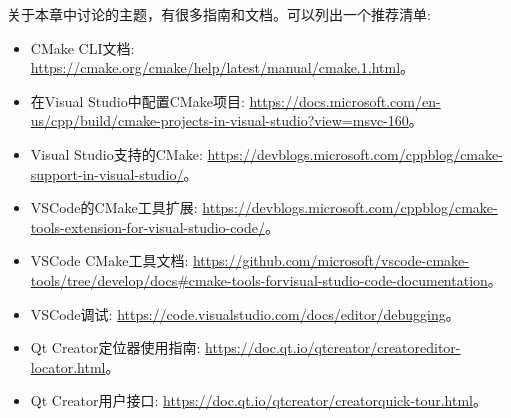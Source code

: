 关于本章中讨论的主题，有很多指南和文档。可以列出一个推荐清单:

\begin{itemize}
\item 
CMake CLI文档: \url{https://cmake.org/cmake/help/latest/manual/cmake.1.html}。

\item
在Visual Studio中配置CMake项目: \url{https://docs.microsoft.com/en-us/cpp/build/cmake-projects-in-visual-studio?view=msvc-160}。

\item
Visual Studio支持的CMake: \url{https://devblogs.microsoft.com/cppblog/cmake-support-in-visual-studio/}。

\item
VSCode的CMake工具扩展: \url{https://devblogs.microsoft.com/cppblog/cmake-tools-extension-for-visual-studio-code/}。

\item
VSCode CMake工具文档: \url{https://github.com/microsoft/vscode-cmake-tools/tree/develop/docs#cmake-tools-forvisual-studio-code-documentation}。

\item
VSCode调试: \url{https://code.visualstudio.com/docs/editor/debugging}。

\item
Qt Creator定位器使用指南: \url{https://doc.qt.io/qtcreator/creatoreditor-locator.html}。

\item
Qt Creator用户接口: \url{https://doc.qt.io/qtcreator/creatorquick-tour.html}。
\end{itemize}